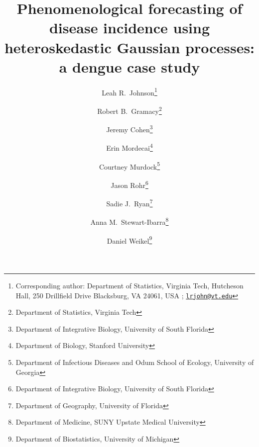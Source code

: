 \documentclass[12pt]{article}
\begin{document}
\newcommand{\bm}[1]{\mbox{\boldmath $#1$}}
\newcommand{\mb}[1]{#1}%
\newcommand{\bE}[0]{\mathbb{E}}
\newcommand{\bV}[0]{\mathbb{V}\mathrm{ar}}
\newcommand{\bP}[0]{\mathbb{P}}
\newcommand{\ve}[0]{\varepsilon}
\newcommand{\mN}[0]{\mathcal{N}}
\newcommand{\iidsim}[0]{\stackrel{\mathrm{iid}}{\sim}}
\newcommand{\NA}[0]{{\tt NA}}
\newcommand{\cB}{\mathcal{B}}
\newcommand{\R}{\mathbb{R}}
\newcommand{\Rp}{\R_+}


\title{\vspace{-1cm} Phenomenological forecasting of disease incidence using heteroskedastic Gaussian processes: a dengue case study }
\author{Leah R.~Johnson\thanks{Corresponding author: Department of Statistics, Virginia Tech,
Hutcheson Hall, 250 Drillfield Drive 
Blacksburg, VA 24061, USA ;
\href{mailto:lrjohn@vt.edu}{\tt lrjohn@vt.edu}}
\and
Robert B.~Gramacy\thanks{Department of Statistics, Virginia Tech}
\and Jeremy Cohen\thanks{Department of Integrative Biology, University of South Florida}
\and Erin Mordecai\thanks{Department of Biology, Stanford University}
\and Courtney Murdock\thanks{Department of Infectious Diseases %
and Odum School of Ecology, University of Georgia}
\and Jason Rohr\thanks{Department of Integrative Biology, University of South Florida}
\and Sadie J.~Ryan\thanks{Department of Geography, University of Florida}
\and Anna M.~Stewart-Ibarra\thanks{Department of Medicine, SUNY Upstate Medical University}
\and Daniel Weikel\thanks{Department of Biostatistics, University of Michigan}
}
\date{}

\maketitle

\vspace{-0.5cm}
\end{document}
